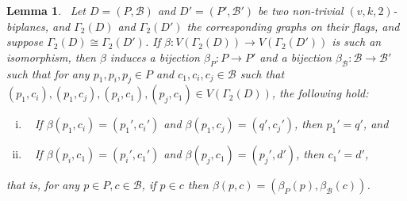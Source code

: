 \documentclass[letterpaper,10pt]{article}
\theoremstyle{plain}
\newtheorem{lem}{Lemma}[section]
\theoremstyle{definition}
\begin{document}
\begin{lem}~\label{beta}
    Let $D=(P,\mathcal{B})$ and $D'=(P',\mathcal{B}')$ be two non-trivial $(v,k,2)$-biplanes, and $\Gamma_2(D)$ and $\Gamma_2(D')$ the corresponding graphs on their flags, and suppose $\Gamma_2(D)\cong\Gamma_2(D')$. If $\beta:V(\Gamma_2(D))\to V(\Gamma_2(D'))$ is such an isomorphism, then $\beta$ induces a bijection $\beta_P:P\to P'$ and a bijection $\beta_{\mathcal{B}}:\mathcal{B}\to\mathcal{B}'$ such that
     for any $p_1,p_i,p_j\in P$ and $c_1,c_i,c_j\in\mathcal{B}$ such that $(p_1,c_i),(p_1,c_j),(p_i,c_1),(p_j,c_1)\in V(\Gamma_2(D))$, the following hold:
    \begin{enumerate}[(i)]
        \item~\label{b1} If $\beta(p_1,c_i)=(p_1',c_i')$ and $\beta(p_1,c_j)=(q',c_j')$, then $p_1'=q'$, and
        \item~\label{b2} If $\beta(p_i,c_1)=(p_i',c_1')$ and $\beta(p_j,c_1)=(p_j',d')$, then $c_1'=d'$,
    \end{enumerate}
    that is, for any $p\in P,c\in\mathcal{B}$, if $p\in c$ then $\beta(p,c)=(\beta_P(p),\beta_\mathcal{B}(c))$.
\end{lem}
\end{document}
